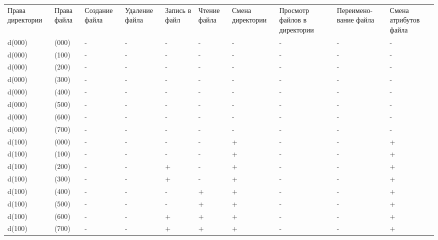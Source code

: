 \documentclass[
  12pt,
  a4paper,
  DIV=11,
  numbers=noendperiod]{scrreprt}
\begin{document}
\begin{longtable}[]{@{}
  >{\raggedright\arraybackslash}p{}
  >{\raggedright\arraybackslash}p{}
  >{\raggedright\arraybackslash}p{}
  >{\raggedright\arraybackslash}p{}
  >{\raggedright\arraybackslash}p{}
  >{\raggedright\arraybackslash}p{}
  >{\raggedright\arraybackslash}p{}
  >{\raggedright\arraybackslash}p{}
  >{\raggedright\arraybackslash}p{}
  >{\raggedright\arraybackslash}p{}@{}}
\toprule\noalign{}
\endhead
\bottomrule\noalign{}
\endlastfoot
Права директории & Права файла & Создание файла & Удаление файла &
Запись в файл & Чтение файла & Смена директории & Просмотр файлов в
директории & Переимено- вание файла & Смена атрибутов файла \\
d(000) & (000) & - & - & - & - & - & - & - & - \\
d(000) & (100) & - & - & - & - & - & - & - & - \\
d(000) & (200) & - & - & - & - & - & - & - & - \\
d(000) & (300) & - & - & - & - & - & - & - & - \\
d(000) & (400) & - & - & - & - & - & - & - & - \\
d(000) & (500) & - & - & - & - & - & - & - & - \\
d(000) & (600) & - & - & - & - & - & - & - & - \\
d(000) & (700) & - & - & - & - & - & - & - & - \\
d(100) & (000) & - & - & - & - & + & - & - & + \\
d(100) & (100) & - & - & - & - & + & - & - & + \\
d(100) & (200) & - & - & + & - & + & - & - & + \\
d(100) & (300) & - & - & + & - & + & - & - & + \\
d(100) & (400) & - & - & - & + & + & - & - & + \\
d(100) & (500) & - & - & - & + & + & - & - & + \\
d(100) & (600) & - & - & + & + & + & - & - & + \\
d(100) & (700) & - & - & + & + & + & - & - & + \\

\end{longtable}
\end{document}
